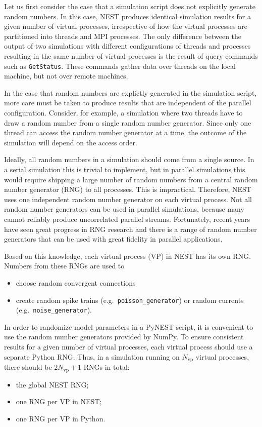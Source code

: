 \documentclass{article}
\newcommand{\Nvp}{N_{\text{vp}}}
\begin{document}
Let us first consider the case that a simulation script does not
explicitly generate random numbers. In this case, NEST produces
identical simulation results for a given number of virtual processes,
irrespective of how the virtual processes are partitioned into threads
and MPI processes. The only difference between the output of two
simulations with different configurations of threads and processes
resulting in the same number of virtual processes is the result of
query commands such as \lstinline!GetStatus!. These commands 
gather data over threads on the local machine, but not over remote
machines.

In the case that random numbers are explictly generated in the
simulation script, more care must be taken to produce results that are
independent of the parallel configuration. Consider, for example, a
simulation where two threads have to draw a random number from a
single random number generator. Since only one thread can access the
random number generator at a time, the outcome of the simulation will
depend on the access order.

Ideally, all random numbers in a simulation should come from a single
source. In a serial simulation this is trivial to implement, but in
parallel simulations this would require shipping a large number of
random numbers from a central random number generator (RNG) to all
processes. This is impractical.  Therefore, NEST uses one independent
random number generator on each
virtual process. Not all random number generators can be used in
parallel simulations, because many cannot reliably produce
uncorrelated parallel streams. Fortunately, recent years have seen
great progress in RNG research and there is a range of random number
generators that can be used with great fidelity in parallel
applications.

Based on this knowledge, each virtual process (VP) in NEST has its own
RNG. Numbers from these RNGs are used to
\begin{itemize}
\item choose random convergent connections
\item create random spike trains (e.g.\ \lstinline!poisson_generator!)
  or random currents
  (e.g.\ \lstinline!noise_generator!).
\end{itemize}

In order to randomize model parameters in a PyNEST script, it is
convenient to use the random number generators provided by
NumPy. To ensure consistent results for a given number
of virtual processes, each virtual process should use a separate
Python RNG. Thus, in a simulation running on $\Nvp$ virtual processes,
there should be $2\Nvp+1$ RNGs in total:
\begin{itemize}
\item the global NEST RNG;
\item one RNG per VP in NEST;
\item one RNG per VP in Python.
\end{itemize}
\end{document}
